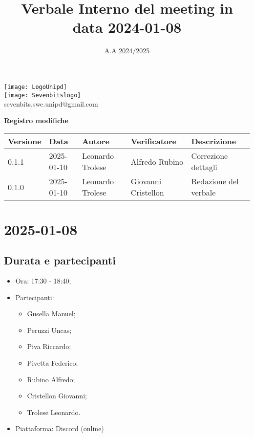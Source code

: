 \documentclass[10pt]{article}
\title{Verbale Interno del meeting in data 2024-01-08}
\date{A.A 2024/2025}
\begin{document}
\maketitle
\begin{center}
\texttt{[image: LogoUnipd]}\\
\texttt{[image: Sevenbitslogo]}\\
sevenbits.swe.unipd@gmail.com\\
\vspace{2mm}

\textbf{Registro modifiche}\\
\vspace{2mm}
\begin{tabularx}{\textwidth}{|l|l|l|l|X|}
\hline
\textbf{Versione} & \textbf{Data} & \textbf{Autore} & \textbf{Verificatore} & \textbf{Descrizione} \\
\hline
0.1.1 & 2025-01-10 & Leonardo Trolese & Alfredo Rubino & Correzione dettagli \\
\hline
0.1.0 & 2025-01-10 & Leonardo Trolese & Giovanni Cristellon & Redazione del verbale \\
\hline
\end{tabularx}
\end{center}

\newpage
\tableofcontents
\newpage
\section{2025-01-08}
\subsection{Durata e partecipanti}
\begin{itemize}
\item Ora: 17:30 - 18:40;
\item Partecipanti: 	
	\begin{itemize}
		\item Gusella Manuel;
		\item Peruzzi Uncas;
		\item Piva Riccardo;
		\item Pivetta Federico;
		\item Rubino Alfredo;
		\item Cristellon Giovanni;
		\item Trolese Leonardo.
	\end{itemize}
\item Piattaforma: Discord (online)
\end{itemize}
\end{document}

